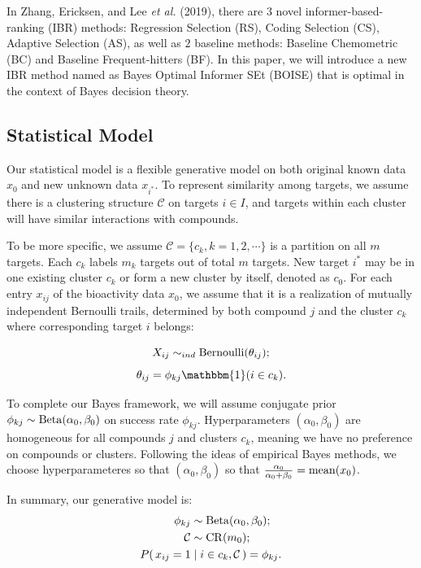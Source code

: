 \documentclass[12pt]{article}
\begin{document}
In Zhang, Ericksen, and Lee {\em et al.} (2019), there are $3$ novel informer-based-ranking (IBR) methods: Regression Selection (RS), Coding Selection (CS), Adaptive Selection (AS), as well as $2$ baseline methods: Baseline Chemometric (BC) and Baseline Frequent-hitters (BF). In this paper, we will introduce a new IBR method named as Bayes Optimal Informer SEt (BOISE) that is optimal in the context of Bayes decision theory.

\subsection{Statistical Model}

Our statistical model is a flexible generative model on both original known data $x_0$ and new unknown data $x_{i^*}$. 
To represent similarity among targets, we assume there is a clustering structure $\mathcal{C}$ on targets $i\in I$, and targets within each cluster will have similar interactions with compounds. 

To be more specific, we assume $\mathcal{C} = \{c_k, k = 1,2,\cdots\}$ is a partition on all $m$ targets. Each $c_k$ labels $m_k$ targets out of total $m$ targets. New target $i^*$ may be in one existing cluster $c_k$ or form a new cluster by itself, denoted as $c_0$. For each entry $x_{ij}$ of the bioactivity data $x_0$, we assume that it is a realization of mutually independent Bernoulli trails,  determined by both compound $j$ and the cluster $c_k$ where corresponding target $i$ belongs: 

$$
X_{ij}\sim_{ind} {\rm Bernoulli}(\theta_{ij});$$$$
\theta_{ij} = \phi_{kj}\mathbbm{1}(i\in c_k).
$$

To complete our Bayes framework, we will assume conjugate prior  $\phi_{kj}\sim {\rm Beta}(\alpha_0, \beta_0)$ on success rate $\phi_{kj}$. Hyperparameters $(\alpha_0,\beta_0)$ are homogeneous for all compounds $j$ and clusters $c_k$, meaning we have no preference on compounds or clusters. Following the ideas of empirical Bayes methods,  we choose hyperparameteres so that $(\alpha_0,\beta_0)$ so that $\frac{\alpha_0}{\alpha_0+\beta_0} = {\rm mean}(x_0)$. 

In summary, our generative model is:
\begin{align}
\label{eq:model}
\begin{split}
    \phi_{kj}&\sim {\rm Beta}(\alpha_0,\beta_0);\\
\mathcal{C} &\sim {\rm CR}(m_0);\\
P(\,x_{ij}=1&\mid i\in c_k, \mathcal{C}\,)= \phi_{kj}.
\end{split}
\end{align}
\end{document}
